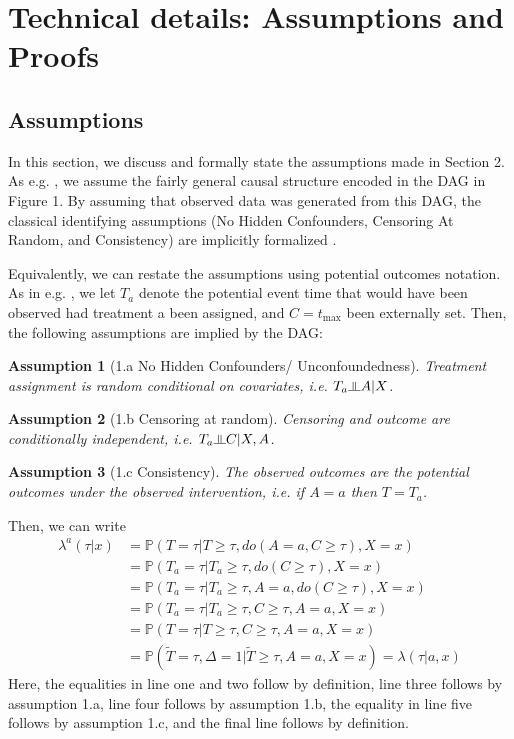 \documentclass{article}
\newtheorem{assumption}{Assumption}
\newcommand{\PR}{{\mathbb P}}
\newcommand{\tmax}{{t_{\text{max}}}}
\newcommand{\indep}{\small {\raisebox{0.05em}{\rotatebox[origin=c]{90}{$\models$}}}}
\begin{document}
\section{Technical details: Assumptions and Proofs} \newnumbering



\subsection{Assumptions}\label{sec:assumptions}
In this section, we discuss and formally state the assumptions made in Section 2. As e.g. \cite{stitelman2010collaborative, stitelman2011targeted, cai2019targeted}, we assume the fairly general causal structure encoded in the DAG in Figure 1. By assuming that observed data was generated from this DAG, the classical identifying assumptions (No Hidden Confounders, Censoring At Random, and Consistency) are implicitly formalized \cite{stitelman2010collaborative}. 

Equivalently, we can restate the assumptions using potential outcomes \cite{rubin2005causal} notation.  As in e.g. \cite{diaz2018targeted}, we let $T_a$ denote the potential event time that would have been observed had treatment a been assigned, and $C=\tmax$ been externally set. Then, the following assumptions are implied by the DAG:


\begin{assumption}[1.a No Hidden Confounders/ Unconfoundedness] Treatment assignment is random conditional on covariates, i.e. $T_a  \indep A | X$.
\end{assumption}

\begin{assumption}[1.b Censoring at random] Censoring and outcome are conditionally independent, i.e.  $T_a \indep C | X, A$.
\end{assumption}

\begin{assumption}[1.c Consistency] The observed outcomes are the potential outcomes under the observed intervention, i.e. if $A=a$ then $T=T_a$.
\end{assumption}

Then, we can write 
\begin{equation*}
\begin{split}
 \lambda^{a}(\tau|x) &= \PR(T=\tau | T \geq \tau, do(A=a, C\geq \tau), X=x)\\
 &= \PR(T_a=\tau | T_a \geq \tau, do(C\geq \tau), X=x) \\
 &= \PR(T_a=\tau | T_a \geq \tau, A=a, do(C\geq \tau), X=x) \\
 &=  \PR(T_a=\tau | T_a \geq \tau, C\geq \tau, A=a, X=x) \\
 &= \PR(T=\tau | T \geq \tau,    C\geq \tau, A=a, X=x) \\
 &=  \PR(\tilde{T}=\tau, \Delta=1|\tilde{T} \geq \tau, A=a, X=x) = \lambda(\tau|a,x) 
\end{split}
\end{equation*}
Here, the equalities in line one and two follow by definition, line three follows by assumption 1.a, line four follows by assumption 1.b,  the equality in line five follows by assumption 1.c, and the final line follows by definition. 
\end{document}
